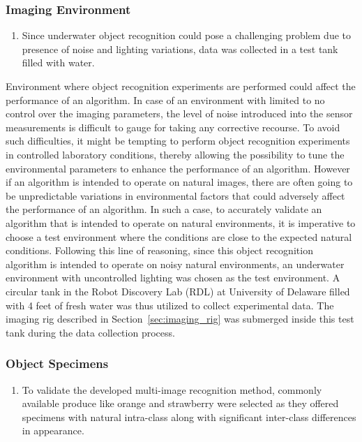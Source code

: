 \documentclass {udthesis}
\begin{document}
\subsubsection{Imaging Environment}


\begin{enumerate}
	\item Since underwater object recognition could pose a challenging problem due to presence of noise and lighting variations, data was collected in a test tank filled with water.
\end{enumerate}


Environment where object recognition experiments are performed could affect the performance of an algorithm. In case of an environment with limited to no control over the imaging parameters, the level of noise introduced into the sensor measurements is difficult to gauge for taking any corrective recourse. To avoid such difficulties, it might be tempting to perform object recognition experiments in controlled laboratory conditions, thereby allowing the possibility to tune the environmental parameters to enhance the performance of an algorithm. However if an algorithm is intended to operate on natural images, there are often going to be unpredictable variations in environmental factors that could adversely affect the performance of an algorithm. In such a case, to accurately validate an algorithm that is intended to operate on natural environments, it is imperative to choose a 
test environment where the conditions are close to the expected natural conditions. Following this line of reasoning, since this object recognition algorithm is intended to operate on noisy natural environments, an underwater environment with uncontrolled lighting was chosen as the test environment. A circular tank in the Robot Discovery Lab (RDL) at University of Delaware filled with 4 feet of fresh water was thus utilized to collect experimental data. The imaging rig described in Section~\ref{sec:imaging_rig} was submerged inside this test tank during the data collection process.

\subsubsection{Object Specimens}


\begin{enumerate}
	\item To validate the developed multi-image recognition method, commonly available produce like orange and strawberry were selected as they offered specimens with natural intra-class along with significant inter-class differences in appearance.
\end{enumerate}
\end{document}
